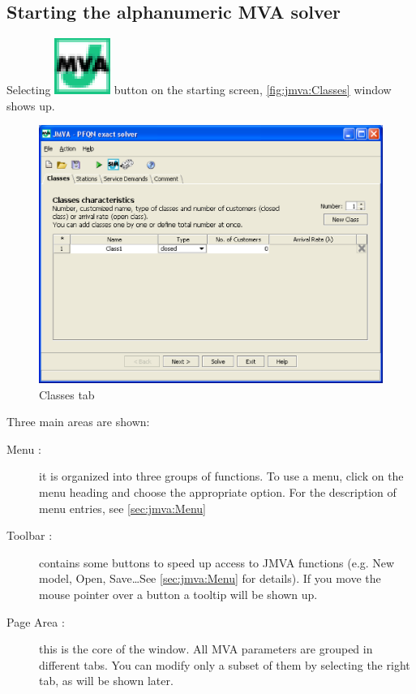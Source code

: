 \subsection{Starting the alphanumeric MVA solver}
Selecting \includegraphics[scale=.5]{img/JMVAIcon} button on the
starting screen, \autoref{fig:jmva:Classes} window shows up.
\begin{figure}[htbp]
    \begin{center}
        \includegraphics[scale=.5]{img/jmva/classes}
    \end{center}
    \caption{Classes tab}
    \label{fig:jmva:Classes}
\end{figure}
Three main areas are shown:
\begin{description}
\item[Menu :] it is organized into three groups of functions. To use a
menu, click on the menu heading and choose the appropriate option.
For the description of menu entries, see \autoref{sec:jmva:Menu}
\item[Toolbar :] contains some buttons to speed up access to JMVA functions
(e.g. New model, Open, Save\dots See \autoref{sec:jmva:Menu} for
details). If you move the mouse pointer over a button a tooltip will
be shown up.
\item[Page Area :] this is the core of the window. All MVA parameters are grouped in
different tabs. You can modify only a subset of them by selecting
the right tab, as will be shown later.
\end{description}

